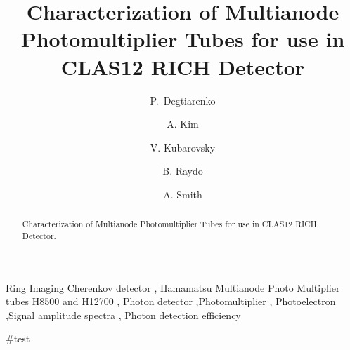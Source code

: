 \documentclass[5p,times,preprint]{elsarticle}
\begin{document}
\begin{frontmatter}
\title{Characterization of Multianode Photomultiplier Tubes for use in CLAS12 RICH Detector}

\author[A]{P.~Degtiarenko }
\author[B]{A. Kim } 
\author[A]{V. Kubarovsky }
\author[A]{B. Raydo}
\author[C]{A. Smith}



\address[A]{Jefferson Lab, Newport News, Virginia, USA}
\address[B]{University of Connecticut, Storrs, CT 0626, USA}
\address[C]{Duke University, Durham, NC 2770, USA}



\begin{abstract}
Characterization of Multianode Photomultiplier Tubes for use in CLAS12 RICH Detector.
\end{abstract}

\begin{keyword}
Ring Imaging Cherenkov detector \sep
Hamamatsu Multianode Photo Multiplier tubes H8500 and H12700 \sep
Photon detector \sep Photomultiplier  \sep
Photoelectron  \sep  Signal amplitude spectra \sep 
Photon detection efficiency
\end{keyword}


\end{frontmatter}

#test

\begin{tcolorbox}[halign=center,colback=white,colbacktitle=red!40!white,colframe=red!80!white,left=0pt,right=0pt,top=0pt,bottom=0pt,boxrule=4pt,title={\bfseries\color{black}For draft only, to be removed in final version}]
\tableofcontents
\end{tcolorbox}




\end{document}
